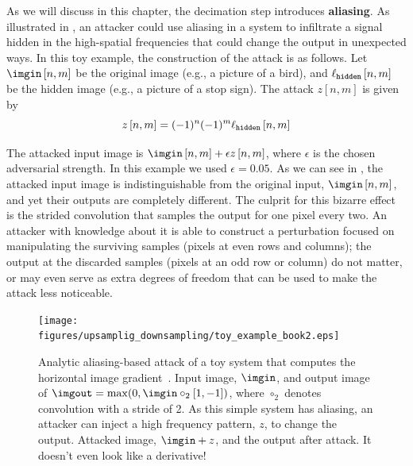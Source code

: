 

As we will discuss in this chapter, the decimation step introduces {\bf aliasing}. As illustrated in \fig{\ref{figure:simple-network}}, an attacker could use aliasing in a system to infiltrate a signal hidden in the high-spatial frequencies that could change the output in unexpected ways.
In this toy example, the construction of the attack is as follows. Let $\imgin \left[n,m\right]$ be the original image (e.g., a picture of a bird), and $\ell_{\texttt{hidden}} \left[n,m\right]$ be the hidden image (e.g., a picture of a stop sign). The attack $z \left[n,m\right]$ is given by
\begin{equation}
	\label{equation:aliasing-attack}
	z \left[n,m\right] = (-1)^n(-1)^m \ell_{\texttt{hidden}} \left[n,m\right]
\end{equation}

The attacked input image is $\imgin \left[n,m\right]+ \epsilon z \left[n,m\right]$, where $\epsilon$ is the chosen adversarial strength. In this example we used $\epsilon=0.05$. As we can see in \fig{\ref{figure:simple-network}}, the attacked input image is indistinguishable from the original input, $\imgin \left[n,m\right]$, and yet their outputs are completely different. The culprit for this bizarre effect is the strided convolution that samples the output for one pixel every two. An attacker with knowledge about it is able to construct a perturbation focused on manipulating the surviving samples (pixels at even rows and columns); the output at the discarded samples (pixels at an odd row or column) do not matter, or may even serve as extra degrees of freedom that can be used to make the attack less noticeable.




\begin{figure}[t]
	\centerline{
		\texttt{[image: figures/upsamplig\_downsampling/toy\_example\_book2.eps]}
	}
	\caption{Analytic aliasing-based attack of a toy system that computes the horizontal image gradient~\cite{rodríguezmuñoz2022aliasing}. Input image, $\imgin$, and  output image of $\imgout=\max(0, \imgin \circ_2 [1, -1])$, where $\circ_2$ denotes convolution with a stride of 2. As this simple system has aliasing, an attacker can inject a high frequency pattern, $z$, to change the output. Attacked image, $\imgin+z$, and the output after attack. It doesn't even look like a derivative!}
	\label{figure:simple-network}
\end{figure}


